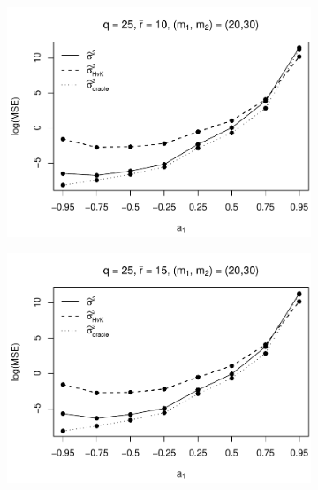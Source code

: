 \begin{figure}[p]
\begin{subfigure}[b]{0.45\textwidth}
\includegraphics[width=\textwidth]{Plots/Robustness/MSE_lrv_T=500_slope=10_(q,K1,K2,M1,M2)=(25,2,10,20,30).pdf}
\end{subfigure}
\hspace{0.25cm}
\begin{subfigure}[b]{0.45\textwidth}
\includegraphics[width=\textwidth]{Plots/Robustness/MSE_lrv_T=500_slope=10_(q,K1,K2,M1,M2)=(25,2,15,20,30).pdf}
\end{subfigure}


\end{figure}
